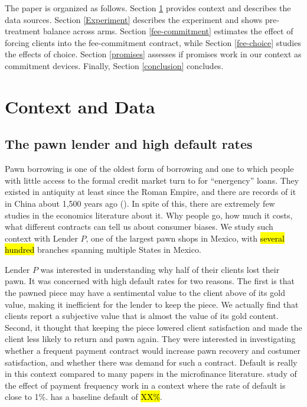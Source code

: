 \documentclass[11pt]{article}
\begin{document}
The paper is organized as follows. Section \ref{context} provides context and describes the data sources. Section \ref{Experiment} describes the experiment and shows pre-treatment balance across arms. Section \ref{fee-commitment} estimates the effect of forcing clients into the fee-commitment contract, while Section \ref{fee-choice} studies the effects of choice. Section \ref{promises} assesses if promises work in our context as commitment devices. Finally, Section \ref{conclusion} concludes.


\section{Context and Data} \label{context}

\subsection{The pawn lender and high default rates}
    
Pawn borrowing is one of the oldest form of borrowing and one to which people with little access to the formal credit market turn to for ``energency'' loans. They existed in antiquity at least since the Roman Empire, and there are records of it in China about 1,500 years ago (\cite{PawnShops}). In spite of this, there are extremely few studies in the economics literature about it. Why people go, how much it costs, what different contracts can tell us about consumer biases. We study such  context with Lender $P$, one of the largest pawn shops in Mexico, with \hl{several hundred} branches spanning multiple States in Mexico.

Lender $P$ was interested in understanding why half of their clients lost their pawn. It was concerned with high default rates for two reasons. The first is that the pawned piece may have a sentimental value to the client above of its gold value, making it inefficient for the lender to keep the piece. We actually find that clients report a subjective value that is almost  the value of its gold content. Second, it thought that keeping the piece lowered client satisfaction and made the client less likely to return and pawn again. They were interested in investigating whether a frequent payment contract would increase pawn recovery and costumer satisfaction, and whether there was demand for such a contract. Default is really  in this context  compared to many papers in the microfinance literature. \cite{Pande} study of the effect of payment frequency work in a context where the rate of default is close to 1\%. \cite{LittleAtAtime} has a baseline default of \hl{XX\%}.
\end{document}
